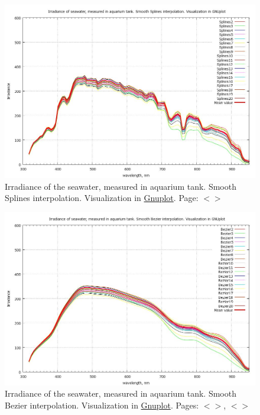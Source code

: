 \documentclass[11pt]{article}
\begin{document}
\begin{appendices}
\begin{figure}[H]
	\begin{center}
		\includegraphics[scale=0.30]{GNU-Irr-Splines.jpg}
		\caption{Irradiance of the seawater, measured in aquarium tank. Smooth Splines interpolation. Visualization in \href{http://www.gnuplot.info/}{Gnuplot}. Page: $<$\pageref{page-31}$>$­}
		\label{fig:A.17}
	\end{center}
\end{figure}
\begin{figure}[H]
	\centering
	\includegraphics[scale=0.30]{GNU-Irr.jpg}
	\caption{Irradiance of the seawater, measured in aquarium tank. Smooth Bezier interpolation. Visualization in \href{http://www.gnuplot.info/}{Gnuplot}. Pages: $<$\pageref{dataprep}$>$, $<$\pageref{page-30}$>$}
	\label{fig:A.18}
\end{figure}

\end{appendices}
\end{document}
